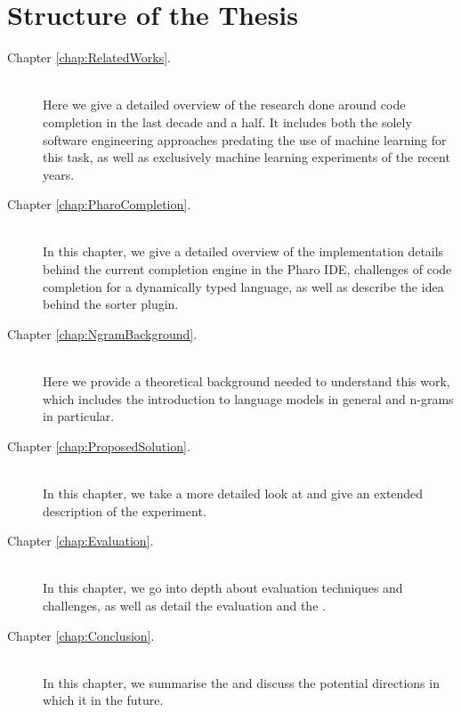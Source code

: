 \section{Structure of the Thesis}
\label{sec:Introduction-Structure}
{\hypersetup{linkcolor=black}
\begin{description}
	\item [Chapter \ref{chap:RelatedWorks}. ] \hfill \\
	Here we give a detailed overview of the research done around code completion in the last decade and a half. It includes both the solely software engineering approaches predating the use of machine learning for this task, as well as exclusively machine learning experiments of the recent years.
    \item [Chapter \ref{chap:PharoCompletion}. ] \hfill \\
	In this chapter, we give a detailed overview of the implementation details behind the current completion engine in the Pharo IDE, challenges of code completion for a dynamically typed language, as well as describe the idea behind the sorter plugin.
	\item [Chapter \ref{chap:NgramBackground}. ] \hfill \\
    Here we provide a theoretical background needed to understand this work, which includes the introduction to language models in general and n-grams in particular.
    \item [Chapter \ref{chap:ProposedSolution}. ] \hfill \\
	In this chapter, we take a more detailed look at  and give an extended description of the experiment.
	\item [Chapter \ref{chap:Evaluation}. ] \hfill \\
    In this chapter, we go into depth about evaluation techniques and challenges, as well as detail the evaluation   and the .
    \item [Chapter \ref{chap:Conclusion}. ] \hfill \\
	In this chapter, we summarise the  and discuss the potential directions in which it  in the future.
\end{description}
}
